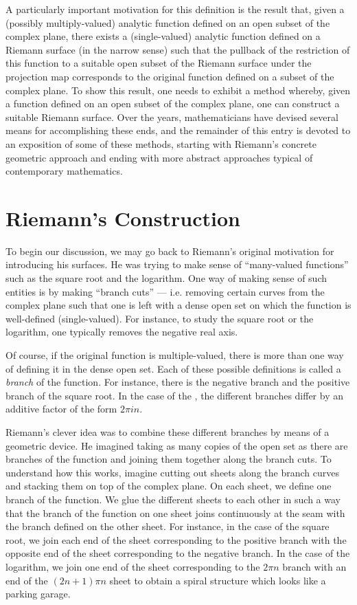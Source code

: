 \documentclass[12pt]{article}
\begin{document}
A particularly important motivation for this definition is the result that, given a (possibly multiply-valued) analytic function defined on an open subset of the complex plane, there exists a (single-valued) analytic function defined on a Riemann surface (in the narrow sense) such that the pullback of the restriction of this function to a suitable open subset of the Riemann surface under the projection map corresponds to the original function defined on a subset of the complex plane.  To show this result, one needs to exhibit a method whereby, given a function defined on an open subset of the complex plane, one can construct a suitable Riemann surface.  Over the years, mathematicians have devised several means for accomplishing these ends, and the remainder of this entry is devoted to an exposition of some of these methods, starting with Riemann's concrete geometric approach and ending with more abstract approaches typical of contemporary mathematics.

\section{Riemann's Construction}

To begin our discussion, we may go back to Riemann's original motivation for introducing his surfaces.  He was trying to make sense of ``many-valued functions'' such as the square root and the logarithm.  One way of making sense of such entities is by making ``branch cuts'' --- i.e. removing certain curves from the complex plane such that one is left with a dense open set on which the function is well-defined (single-valued).  For instance, to study the square root or the logarithm, one typically removes the negative real axis.

Of course, if the original function is multiple-valued, there is more than one way of defining it in the dense open set.  Each of these possible definitions is called a \emph{branch} of the function.  For instance, there is the negative branch and the positive branch of the square root.  In the case of the , the different branches differ by an additive factor of the form $2 \pi i n$.

Riemann's clever idea was to combine these different branches by means of a geometric device.  He imagined taking as many copies of the open set as there are branches of the function and joining them together along the branch cuts.  To understand how this works, imagine cutting out sheets along the branch curves and stacking them on top of the complex plane.  On each sheet, we define one branch of the function.  We glue the different sheets to each other in such a way that the branch of the function on one sheet joins continuously at the seam with the branch defined on the other sheet.  For instance, in the case of the square root, we join each end of the sheet corresponding to the positive branch with the opposite end of the sheet corresponding to the negative branch.  In the case of the logarithm, we join one end of the sheet corresponding to the $2 \pi n$ branch with an end of the $(2n+1) \pi n$ sheet to obtain a spiral structure which looks like a parking garage.
\end{document}
